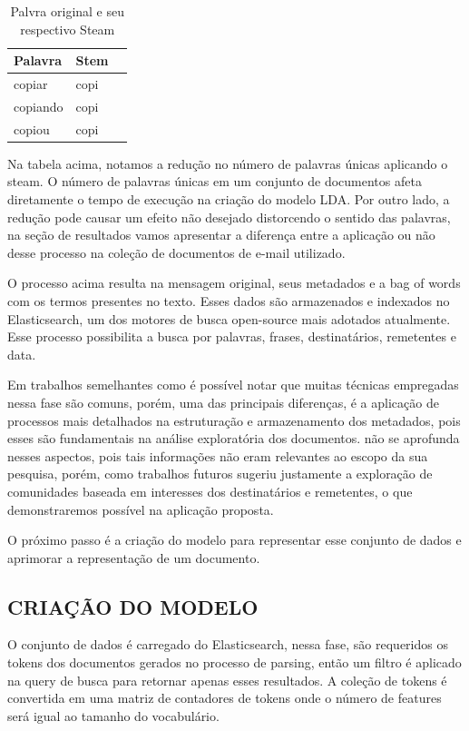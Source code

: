 \documentclass[12pt,a4paper]{article}
\begin{document}
\begin{enumerate}
  
  \begin{table}[h]
    \centering
    \begin{tabular}{l l l}
    Palavra		&Stem &\\
    \hline
    copiar		&copi &\\
    copiando		&copi &\\
    copiou		&copi &\\
    \hline
    \end{tabular}
    \caption{Palvra original e seu respectivo Steam}
  \end{table}
  
  Na tabela acima, notamos a redução no número de palavras únicas aplicando o steam. O número de palavras únicas em um conjunto de documentos afeta diretamente o tempo de execução na criação do modelo LDA.
   Por outro lado, a redução pode causar um efeito não desejado distorcendo o sentido das palavras,
   na seção de resultados vamos apresentar a diferença entre a aplicação ou não desse processo na coleção de documentos de e-mail utilizado.
  \end{enumerate}
  
  
  O processo acima resulta na mensagem original, seus metadados e a bag of words com os termos presentes no texto. Esses dados são armazenados e indexados no Elasticsearch,
   um dos motores de busca open-source mais adotados atualmente. Esse processo possibilita a busca por palavras, frases, destinatários, remetentes e data. 
  
  Em trabalhos semelhantes como  é possível notar que muitas técnicas empregadas nessa fase são comuns, porém, uma das principais diferenças,
   é a aplicação de processos mais detalhados na estruturação e armazenamento dos metadados, pois esses são fundamentais na análise exploratória dos documentos.
    não se aprofunda nesses aspectos, pois tais informações não eram relevantes ao escopo da sua pesquisa,
   porém, como trabalhos futuros sugeriu justamente a exploração de comunidades baseada em interesses dos destinatários e remetentes, o que demonstraremos possível na aplicação proposta.
  
  O próximo passo é a criação do modelo para representar esse conjunto de dados e aprimorar a representação de um documento.
  
  
  
  \subsection{CRIAÇÃO DO MODELO}
  O conjunto de dados é carregado do Elasticsearch, nessa fase, são requeridos os tokens dos documentos gerados no processo de parsing, então
   um filtro é aplicado na query de busca para retornar apenas esses resultados. A coleção de tokens é convertida em uma matriz de contadores de tokens onde o número de features será igual ao tamanho do vocabulário.
  
\end{document}
